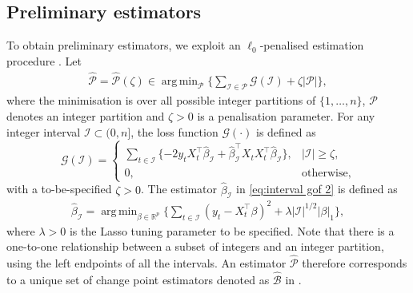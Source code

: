 \documentclass[11pt]{article}
\DeclareMathOperator*{\argmin}{arg\,min}
\newcommand{\I}{{\mathcal I }}
\theoremstyle{plain}
\theoremstyle{definition}
\begin{document}
\subsection{Preliminary estimators}\label{sec:algorithm}

To obtain preliminary estimators, we exploit an $\ell_0$-penalised estimation procedure \citep[e.g.][]{friedrich2008complexity, killick2012optimal, wang2020univariate}.  Let
\begin{align}\label{eq:pre_est}
    \widehat{\mathcal{P}} = \widehat{\mathcal{P}}(\zeta) \in \argmin_{\mathcal{P}} \bigg\{\sum_{\I \in \mathcal{P}}\mathcal{G}(\I) + \zeta|\mathcal{P}| \bigg\},
\end{align}
where the minimisation is over all possible integer partitions of $\{1, \ldots, n\}$, $\mathcal{P}$ denotes an integer partition and $\zeta > 0$ is a penalisation parameter. For any integer interval $\mathcal{I} \subset (0, n]$, the loss function $\mathcal{G}(\cdot)$ is defined as
\begin{equation}\label{eq:interval gof 2}
    \mathcal{G}(\mathcal{I}) = \begin{cases} 
        \sum_{t \in \mathcal I} \{-2y_t X_t^{\top} \widehat{\beta}_{\I} + \widehat{\beta}_{\I}^\top X_t X_t^\top \widehat{\beta}_{\I}\}, & |\I| \geq \zeta, \\
        0, & \text{otherwise},
    \end{cases}    
\end{equation}
with a to-be-specified $\zeta > 0$.  The estimator $\widehat{\beta}_{\mathcal{I}}$ in \eqref{eq:interval gof 2} is defined as 
\begin{align}\label{eq:interval lasso}
\widehat \beta _{ \mathcal I } = \argmin_{\beta \in \mathbb R^p }  \bigg\{\sum_{t \in \mathcal I}   (y_t -X_t ^\top \beta) ^2 +  \lambda |\I |^{1/2}  |\beta |_1 \bigg\},
\end{align}
where $\lambda > 0$ is the Lasso tuning parameter to be specified.  Note that there is a one-to-one relationship between a subset of integers and an integer partition, using the left endpoints of all the intervals.  An estimator $\widehat{\mathcal{P}}$ therefore corresponds to a unique set of change point estimators denoted as $\widehat{\mathcal{B}}$ in . 
\end{document}
